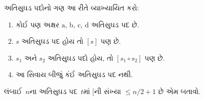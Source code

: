 \documentclass[../../../include/open-logic-section]{subfiles}
\begin{document}
\begin{prob}
  અતિસુઘડ પદોનો ગણ આ રીતે વ્યાખ્યાયિત કરો:
  \begin{enumerate}
  \item કોઈ પણ અક્ષર $\mathrm{a}$, $\mathrm{b}$, $\mathrm{c}$,
    $\mathrm{d}$ અતિસુઘડ પદ છે.
  \item $s$ અતિસુઘડ પદ હોય તો $[s]$ પણ છે.
  \item $s_1$ અને $s_2$ અતિસુઘડ પદો હોય, તો
    $[s_1 \circ s_2]$ પણ છે.
  \item આ સિવાય બીજું કંઈ અતિસુઘડ પદ નથી.
  \end{enumerate}
  લંબાઈ~$n$ના અતિસુઘડ પદ~$t$માં $[$ની
  સંખ્યા $\le n/2 +1$ છે એમ બતાવો.
\end{prob}
\end{document}
